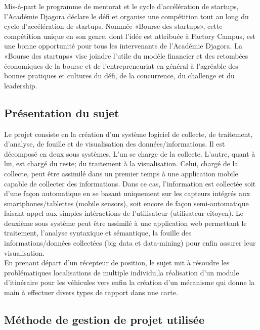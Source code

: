 
Mis-à-part le programme de mentorat et le cycle d’accélération de startups,
l'Académie Djagora déclare le défi et organise une compétition tout au long
du cycle d’accélération de startups. Nommée «Bourse des startups», cette
compétition unique en son genre, dont l'idée est attribuée à Factory Campus,
est une bonne opportunité pour tous les intervenants de l'Académie Djagora.
La «Bourse des startups» vise joindre l'utile du modèle financier et des retombées
économiques de la bourse et de l'entrepreneuriat en général à l'agréable des
bonnes pratiques et cultures du défi, de la concurrence, du challenge et du
leadership.
\subsection{Présentation du sujet}
 Le projet consiste en la création d'un système logiciel de collecte, 
 de traitement, d'analyse, de fouille et de visualisation des données/informations.
 Il est décomposé en deux sous systèmes. L'un se charge de la collecte. L'autre,
 quant à lui, est chargé du reste; du traitement à la visualisation. 
 Celui, chargé de la collecte, peut être assimilé dans un premier temps 
 à une application mobile capable de collecter des informations. Dans ce cas, 
 l'information est collectée soit d'une façon automatique en se basant uniquement 
 sur les capteurs intégrés aux smartphones/tablettes (mobile sensors), 
 soit encore de façon semi-automatique faisant appel aux simples intéractions 
 de l'utilisateur (utilisateur citoyen). Le deuxième sous système peut être 
 assimilé à une application web permettant le traitement, l'analyse syntaxique
 et sémantique, la fouille des informations/données collectées (big data et
 data-mining) pour enfin assurer leur visualisation. \\
En prenant départ d'un récepteur de position, le sujet mit à résoudre les
problématiques localisations de multiple individu,la réalisation d'un module
d'itinéraire pour les véhicules vers enfin la création d'un mécanisme qui donne
la main à effectuer divers types de rapport dans une carte.
\subsection{Méthode de gestion de projet utilisée}
